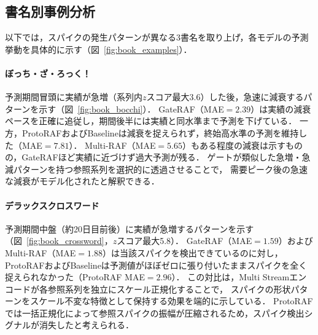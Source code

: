 \documentclass[twocolumn, lastpage]{jarticle}
\begin{document}
\subsection{書名別事例分析}
以下では，スパイクの発生パターンが異なる3書名を取り上げ，各モデルの予測挙動を具体的に示す（図~\ref{fig:book_examples}）．

    \paragraph{ぼっち・ざ・ろっく！}
    予測期間冒頭に実績が急増（系列内$z$スコア最大3.6）した後，急速に減衰するパターンを示す（図~\ref{fig:book_bocchi}）．
    GateRAF（MAE$=2.39$）は実績の減衰ペースを正確に追従し，期間後半には実績と同水準まで予測を下げている．
    一方，ProtoRAFおよびBaselineは減衰を捉えられず，終始高水準の予測を維持した（MAE$=7.81$）．
    Multi-RAF（MAE$=5.65$）もある程度の減衰は示すものの，GateRAFほど実績に近づけず過大予測が残る．
    ゲートが類似した急増・急減パターンを持つ参照系列を選択的に透過させることで，
    需要ピーク後の急速な減衰がモデル化されたと解釈できる．

    \paragraph{デラックスクロスワード}
    予測期間中盤（約20日目前後）に実績が急増するパターンを示す（図~\ref{fig:book_crossword}，$z$スコア最大5.8）．
    GateRAF（MAE$=1.59$）およびMulti-RAF（MAE$=1.88$）は当該スパイクを検出できているのに対し，
    ProtoRAFおよびBaselineは予測値がほぼゼロに張り付いたままスパイクを全く捉えられなかった（ProtoRAF MAE$=2.96$）．
    この対比は，Multi Streamエンコードが各参照系列を独立にスケール正規化することで，
    スパイクの形状パターンをスケール不変な特徴として保持する効果を端的に示している．
    ProtoRAFでは一括正規化によって参照スパイクの振幅が圧縮されるため，スパイク検出シグナルが消失したと考えられる．
\end{document}
